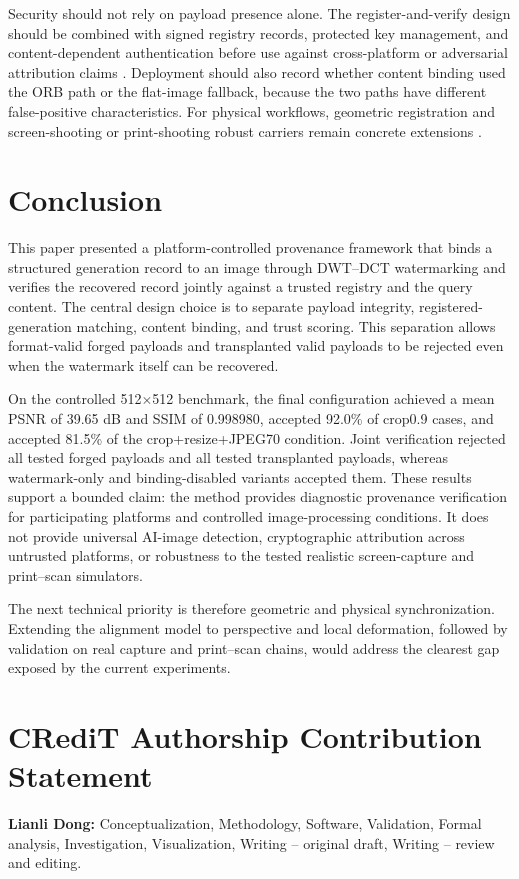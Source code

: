 \documentclass[a4paper,fleqn]{cas-sc}
\begin{document}
Security should not rely on payload presence alone. The register-and-verify
design should be combined with signed registry records, protected key
management, and content-dependent authentication before use against
cross-platform or adversarial attribution claims
\cite{collomosse_authenticity_2024,zhou_metaseal_2026}. Deployment should also
record whether content binding used the ORB path or the flat-image fallback,
because the two paths have different false-positive characteristics. For
physical workflows, geometric registration and screen-shooting or print-shooting
robust carriers remain concrete extensions
\cite{cao_screen-shooting_2023,peng_screen-shooting_2025,yan_dual-domain_2026}.

\section{Conclusion}\label{sec:conclusion}
This paper presented a platform-controlled provenance framework that binds a
structured generation record to an image through DWT--DCT watermarking and
verifies the recovered record jointly against a trusted registry and the query
content. The central design choice is to separate payload integrity,
registered-generation matching, content binding, and trust scoring. This
separation allows format-valid forged payloads and transplanted valid payloads
to be rejected even when the watermark itself can be recovered.

On the controlled 512$\times$512 benchmark, the final configuration achieved a
mean PSNR of 39.65 dB and SSIM of 0.998980, accepted 92.0\% of crop0.9 cases,
and accepted 81.5\% of the crop+resize+JPEG70 condition. Joint verification
rejected all tested forged payloads and all tested transplanted payloads,
whereas watermark-only and binding-disabled variants accepted them. These
results support a bounded claim: the method provides diagnostic provenance
verification for participating platforms and controlled image-processing
conditions. It does not provide universal AI-image detection, cryptographic
attribution across untrusted platforms, or robustness to the tested realistic
screen-capture and print--scan simulators.

The next technical priority is therefore geometric and physical synchronization.
Extending the alignment model to perspective and local deformation, followed by
validation on real capture and print--scan chains, would address the clearest
gap exposed by the current experiments.

\section*{CRediT Authorship Contribution Statement}
\textbf{Lianli Dong:} Conceptualization, Methodology, Software, Validation,
Formal analysis, Investigation, Visualization, Writing -- original draft,
Writing -- review and editing.
\end{document}
